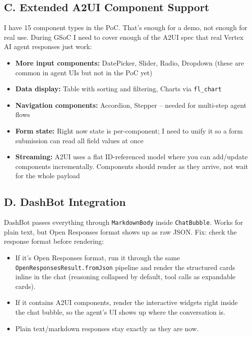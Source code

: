 \documentclass[11pt,a4paper]{article}
\begin{document}
\subsection{C. Extended A2UI Component Support}

I have 15 component types in the PoC. That's enough for a demo, not enough for real use. During GSoC I need to cover enough of the A2UI spec that real Vertex AI agent responses just work:

\begin{itemize}
  \item \textbf{More input components:} DatePicker, Slider, Radio, Dropdown (these are common in agent UIs but not in the PoC yet)
  \item \textbf{Data display:} Table with sorting and filtering, Charts via \texttt{fl\_chart}
  \item \textbf{Navigation components:} Accordion, Stepper -- needed for multi-step agent flows
  \item \textbf{Form state:} Right now state is per-component; I need to unify it so a form submission can read all field values at once
  \item \textbf{Streaming:} A2UI uses a flat ID-referenced model where you can add/update components incrementally. Components should render as they arrive, not wait for the whole payload
\end{itemize}

\subsection{D. DashBot Integration}

DashBot passes everything through \texttt{MarkdownBody} inside \texttt{ChatBubble}. Works for plain text, but Open Responses format shows up as raw JSON. Fix: check the response format before rendering:

\begin{itemize}
  \item If it's Open Responses format, run it through the same \texttt{OpenResponsesResult.fromJson} pipeline and render the structured cards inline in the chat (reasoning collapsed by default, tool calls as expandable cards).
  \item If it contains A2UI components, render the interactive widgets right inside the chat bubble, so the agent's UI shows up where the conversation is.
  \item Plain text/markdown responses stay exactly as they are now.
\end{itemize}
\end{document}
